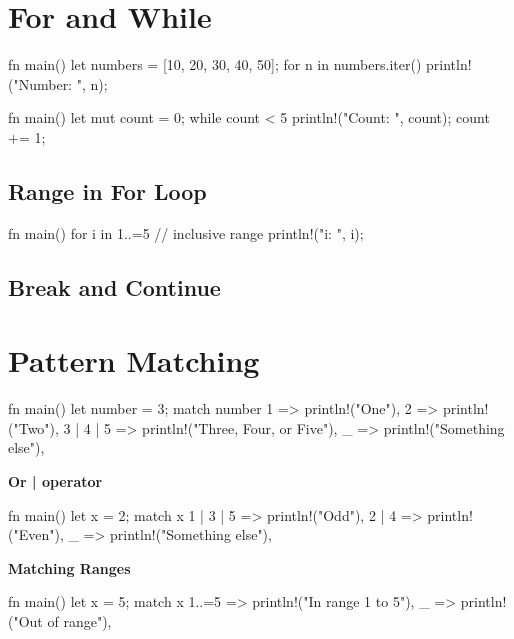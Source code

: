 \documentclass[8pt,a4paper,twocolumn]{extarticle}
\begin{document}
\section{For and While}
\begin{Code}
fn main() {
    let numbers = [10, 20, 30, 40, 50];
    for n in numbers.iter() {
        println!("Number: {}", n);
    }
}
\end{Code}
\begin{Code}
fn main() {
    let mut count = 0;
    while count < 5 {
        println!("Count: {}", count);
        count += 1;
    }
}
\end{Code}

\subsection {Range in For Loop}
\begin{Code}
fn main() {
    for i in 1..=5 { // inclusive range
        println!("i: {}", i);
    }
}
\end{Code}

\subsection{Break and Continue}

\section{Pattern Matching}
\begin{Code}
fn main() {
    let number = 3;
    match number {
        1 => println!("One"),
        2 => println!("Two"),
        3 | 4 | 5 => println!("Three, Four, or Five"),
        _ => println!("Something else"),
    }
}
\end{Code}

\textbf{Or | operator}
\begin{Code}
fn main() {
    let x = 2;
    match x {
        1 | 3 | 5 => println!("Odd"),
        2 | 4 => println!("Even"),
        _ => println!("Something else"),
    }
}
\end{Code}
\textbf{Matching Ranges}
\begin{Code}
fn main() {
    let x = 5;
    match x {
        1..=5 => println!("In range 1 to 5"),
        _ => println!("Out of range"),
    }
}
\end{Code}
\end{document}
